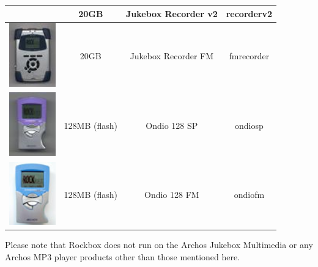 \begin{center}
\begin{tabular}{@{}cccc@{}}
                     & 20GB & Jukebox Recorder v2 & recorderv2\\\midrule
    \includegraphics[width=2cm]{getting_started/images/archos-recorderfm-small.png}
                     & 20GB & Jukebox Recorder FM & fmrecorder \\\midrule
    \includegraphics[width=2cm]{getting_started/images/archos-ondiosp-small.png}
                     & 128MB (flash) & Ondio 128 SP & ondiosp \\\midrule
    \includegraphics[width=2cm]{getting_started/images/archos-ondiofm-small.png}
                     & 128MB (flash) & Ondio 128 FM & ondiofm \\\bottomrule
  \end{tabular}
\end{center}
Please note that Rockbox does not run on the Archos Jukebox Multimedia or any
Archos MP3 player products other than those mentioned here.

